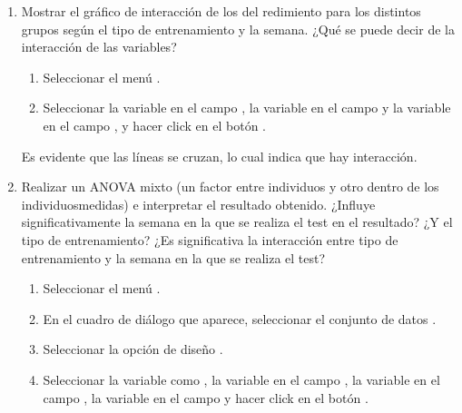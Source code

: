 \begin{enumerate}[leftmargin=*]
\begin{enumerate}
\item Mostrar el gráfico de interacción de los del redimiento para los distintos grupos según el tipo de entrenamiento y
la semana.
¿Qué se puede decir de la interacción de las variables?
\begin{indicacion}{
\begin{enumerate}
\item Seleccionar el menú .
\item Seleccionar la variable  en el campo , la variable
 en el campo  y la variable  en el campo , y hacer click en el botón .
\end{enumerate}
Es evidente que las líneas se cruzan, lo cual indica que hay interacción.
}
\end{indicacion}

\item Realizar un ANOVA mixto (un factor entre individuos y otro dentro de los individuosmedidas) e interpretar el resultado obtenido.
¿Influye significativamente la semana en la que se realiza el test en el resultado? 
¿Y el tipo de entrenamiento?
¿Es significativa la interacción entre tipo de entrenamiento y la semana en la que se realiza el test?
\begin{indicacion}{
\begin{enumerate}
\item Seleccionar el menú .
\item En el cuadro de diálogo que aparece, seleccionar el conjunto de datos .
\item Seleccionar la opción de diseño .
\item Seleccionar la variable  como , la variable
 en el campo , la variable  en el campo
, la variable  en el campo  y hacer click en el botón .
\end{enumerate}
}
\end{indicacion}


\end{enumerate}
\end{enumerate}
